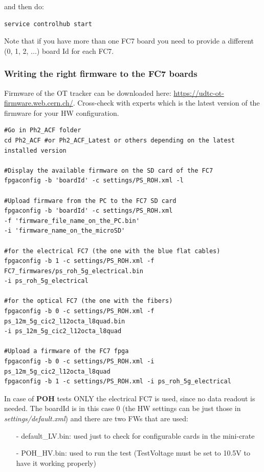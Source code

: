 \documentclass[10pt,a4paper]{article}
\begin{document}
and then do:
\begin{framed}
\begin{verbatim}
service controlhub start
\end{verbatim}
\end{framed}

Note that if you have more than one FC7 board you need to provide a different (0, 1, 2, ...) board Id for each FC7.

\subsubsection{Writing the right firmware to the FC7 boards}
Firmware of the OT tracker can be downloaded here: \url{https://udtc-ot-firmware.web.cern.ch/}.
Cross-check with experts which is the latest version of the firmware for your HW configuration.

\begin{framed}
\begin{verbatim}
#Go in Ph2_ACF folder
cd Ph2_ACF #or Ph2_ACF_Latest or others depending on the latest installed version

#Display the available firmware on the SD card of the FC7
fpgaconfig -b 'boardId' -c settings/PS_ROH.xml -l

#Upload firmware from the PC to the FC7 SD card
fpgaconfig -b 'boardId' -c settings/PS_ROH.xml 
-f 'firmware_file_name_on_the_PC.bin' 
-i 'firmware_name_on_the_microSD'

#for the electrical FC7 (the one with the blue flat cables)
fpgaconfig -b 1 -c settings/PS_ROH.xml -f FC7_firmwares/ps_roh_5g_electrical.bin 
-i ps_roh_5g_electrical

#for the optical FC7 (the one with the fibers)
fpgaconfig -b 0 -c settings/PS_ROH.xml -f ps_12m_5g_cic2_l12octa_l8quad.bin 
-i ps_12m_5g_cic2_l12octa_l8quad

#Upload a firmware of the FC7 fpga
fpgaconfig -b 0 -c settings/PS_ROH.xml -i  ps_12m_5g_cic2_l12octa_l8quad
fpgaconfig -b 1 -c settings/PS_ROH.xml -i ps_roh_5g_electrical
\end{verbatim}
\end{framed}

In case of {\bf POH} tests ONLY the electrical FC7 is used, since no data readout is needed. The boardId is in this case 0 (the HW settings can be just those in {\it settings/default.xml}) and there are two FWs that are used:
\begin{itemize}
\item[-] default\_LV.bin: used just to check for configurable cards in the mini-crate
\item[-] POH\_HV.bin: used to run the test (TestVoltage must be set to 10.5V to have it working properly)
\end{itemize}
 
\end{document}
